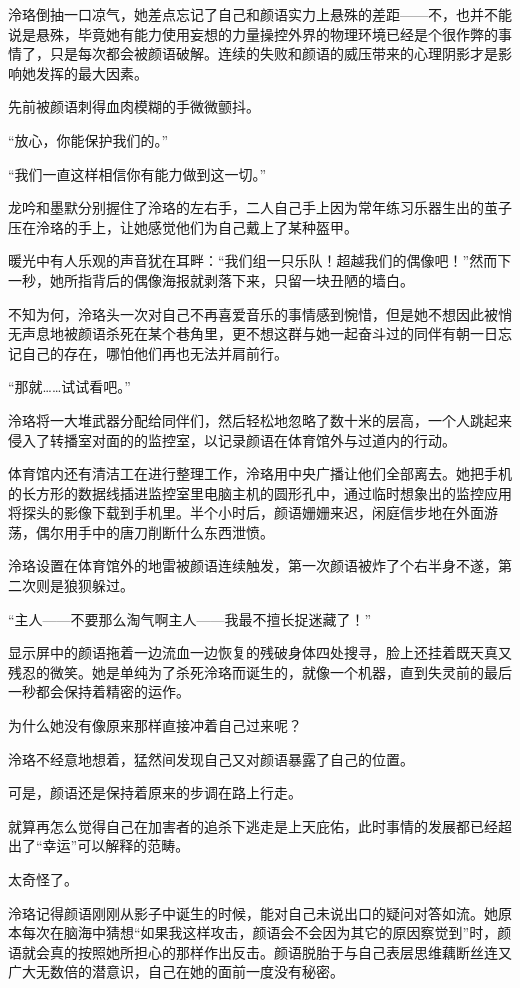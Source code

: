 \documentclass[UTF8, scheme = chinese, openany]{ctexbook}
\begin{document}
泠珞倒抽一口凉气，她差点忘记了自己和颜语实力上悬殊的差距——不，也并不能说是悬殊，毕竟她有能力使用妄想的力量操控外界的物理环境已经是个很作弊的事情了，只是每次都会被颜语破解。连续的失败和颜语的威压带来的心理阴影才是影响她发挥的最大因素。

先前被颜语刺得血肉模糊的手微微颤抖。

“放心，你能保护我们的。”

“我们一直这样相信你有能力做到这一切。”

龙吟和墨默分别握住了泠珞的左右手，二人自己手上因为常年练习乐器生出的茧子压在泠珞的手上，让她感觉他们为自己戴上了某种盔甲。

暖光中有人乐观的声音犹在耳畔：“我们组一只乐队！超越我们的偶像吧！”然而下一秒，她所指背后的偶像海报就剥落下来，只留一块丑陋的墙白。

不知为何，泠珞头一次对自己不再喜爱音乐的事情感到惋惜，但是她不想因此被悄无声息地被颜语杀死在某个巷角里，更不想这群与她一起奋斗过的同伴有朝一日忘记自己的存在，哪怕他们再也无法并肩前行。

“那就……试试看吧。”

泠珞将一大堆武器分配给同伴们，然后轻松地忽略了数十米的层高，一个人跳起来侵入了转播室对面的的监控室，以记录颜语在体育馆外与过道内的行动。

体育馆内还有清洁工在进行整理工作，泠珞用中央广播让他们全部离去。她把手机的长方形的数据线插进监控室里电脑主机的圆形孔中，通过临时想象出的监控应用将探头的影像下载到手机里。半个小时后，颜语姗姗来迟，闲庭信步地在外面游荡，偶尔用手中的唐刀削断什么东西泄愤。

泠珞设置在体育馆外的地雷被颜语连续触发，第一次颜语被炸了个右半身不遂，第二次则是狼狈躲过。

“主人——不要那么淘气啊主人——我最不擅长捉迷藏了！”

显示屏中的颜语拖着一边流血一边恢复的残破身体四处搜寻，脸上还挂着既天真又残忍的微笑。她是单纯为了杀死泠珞而诞生的，就像一个机器，直到失灵前的最后一秒都会保持着精密的运作。

为什么她没有像原来那样直接冲着自己过来呢？

泠珞不经意地想着，猛然间发现自己又对颜语暴露了自己的位置。

可是，颜语还是保持着原来的步调在路上行走。

就算再怎么觉得自己在加害者的追杀下逃走是上天庇佑，此时事情的发展都已经超出了“幸运”可以解释的范畴。

太奇怪了。

泠珞记得颜语刚刚从影子中诞生的时候，能对自己未说出口的疑问对答如流。她原本每次在脑海中猜想“如果我这样攻击，颜语会不会因为其它的原因察觉到”时，颜语就会真的按照她所担心的那样作出反击。颜语脱胎于与自己表层思维藕断丝连又广大无数倍的潜意识，自己在她的面前一度没有秘密。
\end{document}
